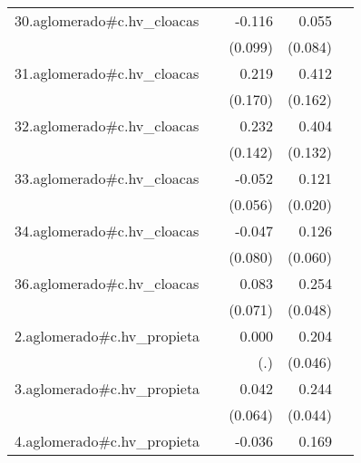 {\begin{longtable}{l*{4}{D{.}{.}{-1}}}
\addlinespace
30.aglomerado#c.hv\_cloacas&                     &      -0.116         &       0.055         &                     \\
            &                     &     (0.099)         &     (0.084)         &                     \\
\addlinespace
31.aglomerado#c.hv\_cloacas&                     &       0.219         &       0.412\sym{*}  &                     \\
            &                     &     (0.170)         &     (0.162)         &                     \\
\addlinespace
32.aglomerado#c.hv\_cloacas&                     &       0.232         &       0.404\sym{**} &                     \\
            &                     &     (0.142)         &     (0.132)         &                     \\
\addlinespace
33.aglomerado#c.hv\_cloacas&                     &      -0.052         &       0.121\sym{***}&                     \\
            &                     &     (0.056)         &     (0.020)         &                     \\
\addlinespace
34.aglomerado#c.hv\_cloacas&                     &      -0.047         &       0.126\sym{*}  &                     \\
            &                     &     (0.080)         &     (0.060)         &                     \\
\addlinespace
36.aglomerado#c.hv\_cloacas&                     &       0.083         &       0.254\sym{***}&                     \\
            &                     &     (0.071)         &     (0.048)         &                     \\
\addlinespace
2.aglomerado#c.hv\_propieta&                     &       0.000         &       0.204\sym{***}&                     \\
            &                     &         (.)         &     (0.046)         &                     \\
\addlinespace
3.aglomerado#c.hv\_propieta&                     &       0.042         &       0.244\sym{***}&                     \\
            &                     &     (0.064)         &     (0.044)         &                     \\
\addlinespace
4.aglomerado#c.hv\_propieta&                     &      -0.036         &       0.169\sym{***}&                     \\

\end{longtable}}
